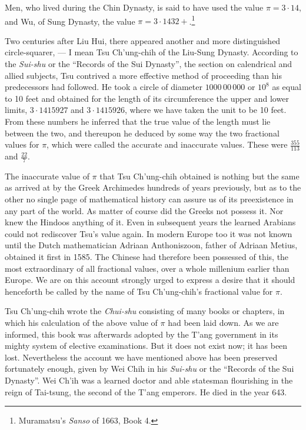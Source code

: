 \documentclass[11pt]{article}
\newcommand{\scanpage}[2]{\clearpage\setcounter{footnote}{0}\noindent{\footnotesize\color{gray}PDF page #1 · #2}\par\medskip}
\newcommand{\scanfooter}{}
\begin{document}
Men, who lived during the Chin Dynasty, is said to have used the value $\pi=3\cdot14$, and Wu, of Sung Dynasty, the value $\pi=3\cdot1432+$.\footnote{Muramatsu's \emph{Sanso} of 1663, Book 4.}
\scanfooter

\scanpage{0064}{Chapter 7, printed page 50}
Two centuries after Liu Hui, there appeared another and more distinguished circle-squarer, --- I mean Tsu Ch'ung-chih of the Liu-Sung Dynasty. According to the \emph{Sui-shu} or the ``Records of the Sui Dynasty'', the section on calendrical and allied subjects, Tsu contrived a more effective method of proceeding than his predecessors had followed. He took a circle of diameter $1000\,00\,000$ or $10^8$ as equal to 10 feet and obtained for the length of its circumference the upper and lower limits, $3\cdot1415927$ and $3\cdot1415926$, where we have taken the unit to be 10 feet. From these numbers he inferred that the true value of the length must lie between the two, and thereupon he deduced by some way the two fractional values for $\pi$, which were called the accurate and inaccurate values. These were $\frac{355}{113}$ and $\frac{22}{7}$.

The inaccurate value of $\pi$ that Tsu Ch'ung-chih obtained is nothing but the same as arrived at by the Greek Archimedes hundreds of years previously, but as to the other no single page of mathematical history can assure us of its preexistence in any part of the world. As matter of course did the Greeks not possess it. Nor knew the Hindoos anything of it. Even in subsequent years the learned Arabians could not rediscover Tsu's value again. In modern Europe too it was not known until the Dutch mathematician Adriaan Anthoniszoon, father of Adriaan Metius, obtained it first in 1585. The Chinese had therefore been possessed of this, the most extraordinary of all fractional values, over a whole millenium earlier than Europe. We are on this account strongly urged to express a desire that it should henceforth be called by the name of Tsu Ch'ung-chih's fractional value for $\pi$.

Tsu Ch'ung-chih wrote the \emph{Chui-shu} consisting of many books or chapters, in which his calculation of the above value of $\pi$ had been laid down. As we are informed, this book was afterwards adopted by the T'ang government in its mighty system of elective examinations. But it does not exist now; it has been lost. Nevertheless the account we have mentioned above has been preserved fortunately enough, given by Wei Chih in his \emph{Sui-shu} or the ``Records of the Sui Dynasty''. Wei Ch'ih was a learned doctor and able statesman flourishing in the reign of Tai-tsung, the second of the T'ang emperors. He died in the year 643.
\end{document}
